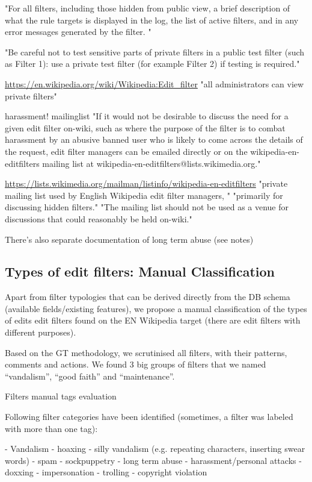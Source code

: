 \documentclass{sigchi}
\begin{document}
"For all filters, including those hidden from public view, a brief description of what the rule targets is displayed in the log, the list of active filters, and in any error messages generated by the filter. "

"Be careful not to test sensitive parts of private filters in a public test filter (such as Filter 1): use a private test filter (for example Filter 2) if testing is required."

\url{https://en.wikipedia.org/wiki/Wikipedia:Edit_filter}
"all administrators can view private filters"

harassment! mailinglist
"If it would not be desirable to discuss the need for a given edit filter on-wiki, such as where the purpose of the filter is to combat harassment by an abusive banned user who is likely to come across the details of the request, edit filter managers can be emailed directly or on the wikipedia-en-editfilters mailing list at wikipedia-en-editfilters@lists.wikimedia.org."

\url{https://lists.wikimedia.org/mailman/listinfo/wikipedia-en-editfilters}
"private mailing list used by English Wikipedia edit filter managers, "
"primarily for discussing hidden filters."
"The mailing list should not be used as a venue for discussions that could reasonably be held on-wiki."

There's also separate documentation of long term abuse (see notes)

\subsection{Types of edit filters: Manual Classification}

Apart from filter typologies that can be derived directly from the DB schema (available fields/existing features), we propose a manual classification of the types of edits edit filters found on the EN Wikipedia target (there are edit filters with different purposes).

Based on the GT methodology, we scrutinised all filters, with their patterns, comments and actions.
We found 3 big groups of filters that we named ``vandalism'', ``good faith'' and ``maintenance''.

Filters manual tags evaluation

Following filter categories have been identified (sometimes, a filter was labeled with more than one tag):

- Vandalism
  - hoaxing
  - silly vandalism (e.g. repeating characters, inserting swear words)
  - spam
  - sockpuppetry
  - long term abuse
  - harassment/personal attacks
    - doxxing
    - impersonation
  - trolling
  - copyright violation
\end{document}
